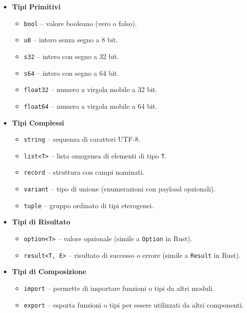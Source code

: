 \begin{itemize}
    \item \textbf{Tipi Primitivi}
    \begin{itemize}
        \item \texttt{bool} -- valore booleano (vero o falso).
        \item \texttt{u8} -- intero senza segno a 8 bit.
        \item \texttt{s32} -- intero con segno a 32 bit.
        \item \texttt{s64} -- intero con segno a 64 bit.
        \item \texttt{float32} -- numero a virgola mobile a 32 bit.
        \item \texttt{float64} -- numero a virgola mobile a 64 bit.
    \end{itemize}

    \item \textbf{Tipi Complessi}
    \begin{itemize}
        \item \texttt{string} -- sequenza di caratteri UTF-8.
        \item \texttt{list<T>} -- lista omogenea di elementi di tipo \texttt{T}.
        \item \texttt{record} -- struttura con campi nominati.
        \item \texttt{variant} -- tipo di unione (enumerazioni con payload opzionali).
        \item \texttt{tuple} -- gruppo ordinato di tipi eterogenei.
    \end{itemize}

    \item \textbf{Tipi di Risultato}
    \begin{itemize}
        \item \texttt{option<T>} -- valore opzionale (simile a \texttt{Option} in Rust).
        \item \texttt{result<T, E>} -- risultato di successo o errore (simile a \texttt{Result} in Rust).
    \end{itemize}

    \item \textbf{Tipi di Composizione}
    \begin{itemize}
        \item \texttt{import} -- permette di importare funzioni o tipi da altri moduli.
        \item \texttt{export} -- esporta funzioni o tipi per essere utilizzati da altri componenti.
    \end{itemize}
\end{itemize}

